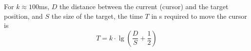 \begin{definition} \label{def:fitts_law} 
  For $k \approx 100$ms, $D$ the distance between the current (cursor) and the target position, and $S$ the size of the target, the time $T$ in s required to move the cursor is
  \begin{equation*}
    T = k \cdot \lg \left( \frac{D}{S} + \frac{1}{2} \right)
  \end{equation*}
\end{definition}
